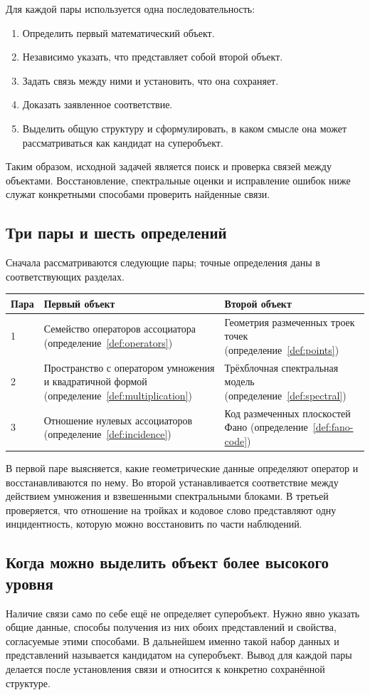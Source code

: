 \documentclass[11pt,a4paper]{article}
\numberwithin{equation}{section}
\theoremstyle{definition}
\theoremstyle{remark}
\begin{document}
Для каждой пары используется одна последовательность:
\begin{enumerate}
 \item Определить первый математический объект.
 \item Независимо указать, что представляет собой второй объект.
 \item Задать связь между ними и установить, что она сохраняет.
 \item Доказать заявленное соответствие.
 \item Выделить общую структуру и сформулировать, в каком смысле
 она может рассматриваться как кандидат на суперобъект.
\end{enumerate}
Таким образом, исходной задачей является поиск и проверка связей
между объектами. Восстановление, спектральные оценки и исправление
ошибок ниже служат конкретными способами проверить найденные связи.

\subsection{Три пары и шесть определений}
Сначала рассматриваются следующие пары; точные определения даны
в соответствующих разделах.
\begin{center}\small
\begin{tabular}{@{}p{}p{}p{}@{}}
\toprule
Пара & Первый объект & Второй объект\\
\midrule
1 & Семейство операторов ассоциатора
(определение~\ref{def:operators}) & Геометрия размеченных троек точек
(определение~\ref{def:points})\\
2 & Пространство с оператором умножения и квадратичной формой
(определение~\ref{def:multiplication}) & Трёхблочная спектральная модель
(определение~\ref{def:spectral})\\
3 & Отношение нулевых ассоциаторов
(определение~\ref{def:incidence}) & Код размеченных плоскостей Фано
(определение~\ref{def:fano-code})\\
\bottomrule
\end{tabular}
\end{center}
В первой паре выясняется, какие геометрические данные определяют
оператор и восстанавливаются по нему. Во второй устанавливается
соответствие между действием умножения и взвешенными спектральными
блоками. В третьей проверяется, что отношение на тройках и кодовое
слово представляют одну инцидентность, которую можно восстановить
по части наблюдений.

\subsection{Когда можно выделить объект более высокого уровня}
Наличие связи само по себе ещё не определяет суперобъект.
Нужно явно указать общие данные, способы получения из них обоих
представлений и свойства, согласуемые этими способами. В дальнейшем
именно такой набор данных и представлений называется кандидатом
на суперобъект. Вывод для каждой пары делается после установления
связи и относится к конкретно сохранённой структуре.
\end{document}
